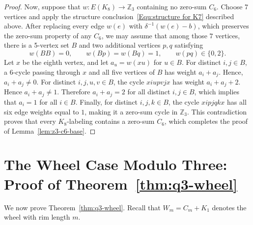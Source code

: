 \documentclass[11pt]{article}
\theoremstyle{remark}
\newcommand{\Z}{\mathbb Z}
\begin{document}
\begin{proof}
    Now, suppose that $w\colon E(K_8)\to\Z_3$ containing no zero-sum $C_6$.
    Choose 7 vertices and apply the structure conclusion~\eqref{Equ:structure for K7} described above.
    After replacing every edge $w(e)$ with $\delta^{-1}(w(e)-b)$, which preserves the zero-sum property of any $C_6$, we may assume that among those $7$ vertices, there is a 5-vertex set $B$ and two additional vertices $p,q$ satisfying
    \[
        w(BB)=0,
        \qquad
        w(Bp)=w(Bq)=1,
        \qquad
        w(pq)\in\{0,2\}.
    \]
    Let $x$ be the eighth vertex, and let $a_u=w(xu)$ for $u\in B$.
    For distinct $i,j\in B$, a $6$-cycle passing through $x$ and all five vertices of $B$ has weight $a_i+a_j$.
    Hence, $a_i+a_j\ne0$.
    For distinct $i,j,u,v\in B$, the cycle $xiupvjx$ has weight $a_i+a_j+2$.
    Hence $a_i+a_j\ne1$.
    Therefore $a_i+a_j=2$ for all distinct $i,j\in B$, which implies that $a_i=1$ for all $i\in B$.
    Finally, for distinct $i,j,k\in B$, the cycle $xipjqkx$ has all six edge weights equal to $1$, making it a zero-sum cycle in $\Z_3$.  This contradiction proves that every $K_8$-labeling contains a zero-sum $C_6$, which completes the proof of Lemma~\ref{lem:z3-c6-base}.
\end{proof}



\section{The Wheel Case Modulo Three: Proof of Theorem~\ref{thm:q3-wheel}}

We now prove Theorem~\ref{thm:q3-wheel}.  Recall that $W_m=C_m+K_1$ denotes the wheel with rim length $m$.
\end{document}
